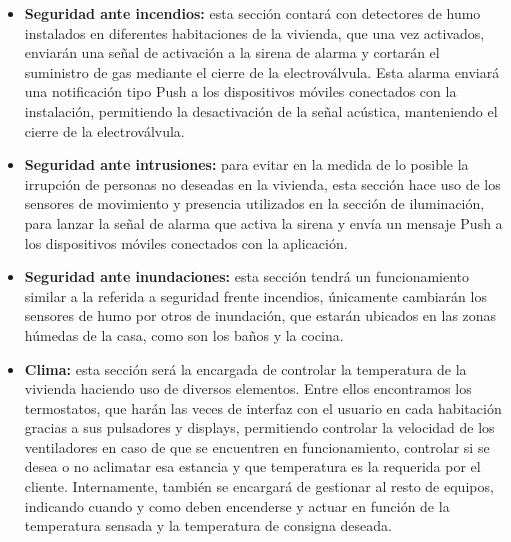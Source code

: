 \begin{itemize}
\item \textbf{Seguridad ante incendios: }esta sección contará con detectores de humo instalados en diferentes habitaciones de la vivienda, que una vez activados, enviarán una señal de activación a la sirena de alarma y cortarán el suministro de gas mediante el cierre de la electroválvula. Esta alarma enviará una notificación tipo Push a los dispositivos móviles conectados con la instalación, permitiendo la desactivación de la señal acústica, manteniendo el cierre de la electroválvula.
\item \textbf{Seguridad ante intrusiones: }para evitar en la medida de lo posible la irrupción de personas no deseadas en la vivienda, esta sección hace uso de los sensores de movimiento y presencia utilizados en la sección de iluminación, para lanzar la señal de alarma que activa la sirena y envía un mensaje Push a los dispositivos móviles conectados con la aplicación.
\item \textbf{Seguridad ante inundaciones: }esta sección tendrá un funcionamiento similar a la referida a seguridad frente incendios, únicamente cambiarán los sensores de humo por otros de inundación, que estarán ubicados en las zonas húmedas de la casa, como son los baños y la cocina.
\item \textbf{Clima:} esta sección será la encargada de controlar la temperatura de la vivienda haciendo uso de diversos elementos. Entre ellos encontramos los termostatos, que harán las veces de interfaz con el usuario en cada habitación gracias a sus pulsadores y displays, permitiendo controlar la velocidad de los ventiladores en caso de que se encuentren en funcionamiento, controlar si se desea o no aclimatar esa estancia y que temperatura es la requerida por el cliente. Internamente, también se encargará de gestionar al resto de equipos, indicando cuando y como deben encenderse y actuar en función de la temperatura sensada y la temperatura de consigna deseada. \\

\end{itemize}

